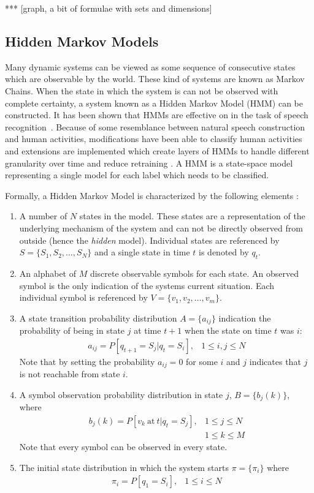 *** [graph, a bit of formulae with sets and dimensions]




\subsection{Hidden Markov Models}
Many dynamic systems can be viewed as some sequence of consecutive states which are observable by the world.
These kind of systems are known as Markov Chains.
When the state in which the system is can not be observed with complete certainty, a system known as a Hidden Markov Model (HMM) can be constructed.
It has been shown that HMMs are effective on in the task of speech recognition~\cite{rabiner1989tutorial}.
Because of some resemblance between natural speech construction and human activities, modifications have been able to classify human activities~\cite{guenterberg2009distributed} and extensions are implemented which create layers of HMMs to handle different granularity over time and reduce retraining \cite{oliver2002layered,perdikis2008recognition}.
A HMM is a state-space model representing a single model for each label which needs to be classified.

Formally, a Hidden Markov Model is characterized by the following elements
\cite{rabiner1989tutorial}:
\begin{enumerate}
	\item
		A number of $N$ states in the model.
		These states are a representation of the underlying mechanism of the system and can not be directly observed from outside (hence the \emph{hidden} model).
		Individual states are referenced by $S = \{S_1, S_2, \dots, S_N \}$ and a single state in time $t$ is denoted by $q_t$.
	\item
		An alphabet of $M$ discrete observable symbols for each state.
		An observed symbol is the only indication of the systems current situation.
		Each individual symbol is referenced by $V = \{ v_1, v_2, \dots, v_m \}$.
	\item
		A state transition probability distribution $A = \{ a_{ij} \}$ indication the probability of being in state $j$ at time $t+1$ when the state on time $t$ was $i$:
		\begin{eqnarray}
			a_{ij} = P [ q_{t+1} = S_j | q_t = S_i ], & 1 \le i, j \le N
		\end{eqnarray}
		Note that by setting the probability $a_{ij}=0$ for some $i$ and $j$ indicates that $j$ is not reachable from state $i$.
	\item
		A symbol observation probability distribution in state $j$, $B = \{b_j(k) \}$, where
		\begin{eqnarray}
			b_j(k) = P[ v_k\ \mathrm{at} \ t | q_t = S_j], & 1 \le j \le N \nonumber \\
			& 1 \le k \le M
		\end{eqnarray}
		Note that every symbol can be observed in every state.
	\item
	The initial state distribution in which the system starts $\pi= \{ \pi_i \}$ where
	\begin{eqnarray}
		\pi_i = P[q_1 = S_i], & 1 \le i \le N
	\end{eqnarray}
\end{enumerate}

